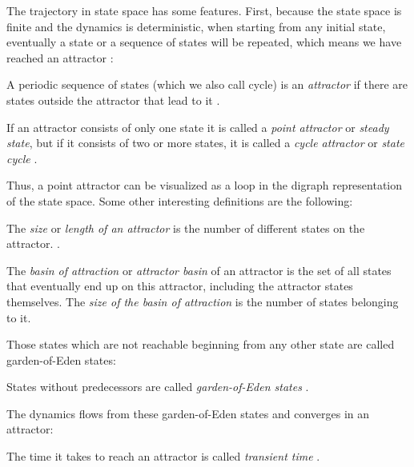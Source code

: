 The trajectory in state space has some features. First, because the state space is finite and the dynamics is deterministic, when starting from any initial state, eventually a state or a sequence of states will be repeated, which means we have reached an attractor \cite{rbn_carlos}:

\begin{defn}
A periodic sequence of states (which we also call cycle) is an \textit{attractor} if there are states outside the attractor that lead to it \cite{rbn_barbara}.
\end{defn}

\begin{defn}
If an attractor consists of only one state it is called a \textit{point attractor} or \textit{steady state}, but if it consists of two or more states, it is called a \textit{cycle attractor} or \textit{state cycle} \cite{attractors}.
\end{defn}

Thus, a point attractor can be visualized as a loop in the digraph representation of the state space. Some other interesting definitions are the following:

\begin{defn}
The \textit{size} or \textit{length of an attractor} is the number of different states on the attractor. \cite{rbn_barbara}.
\end{defn}

\begin{defn}
The \textit{basin of attraction} or \textit{attractor basin} of an attractor is the set of all states that eventually end up on this attractor, including the attractor states themselves. The \textit{size of the basin of attraction} is the number of states belonging to it.
\end{defn}

Those states which are not reachable beginning from any other state are called garden-of-Eden states:

\begin{defn}
States without predecessors are called \textit{garden-of-Eden states} \cite{rbn_carlos}.
\end{defn}

The dynamics flows from these garden-of-Eden states and converges in an attractor:

\begin{defn}
The time it takes to reach an attractor is called \textit{transient time}  \cite{rbn_carlos}.
\end{defn}


